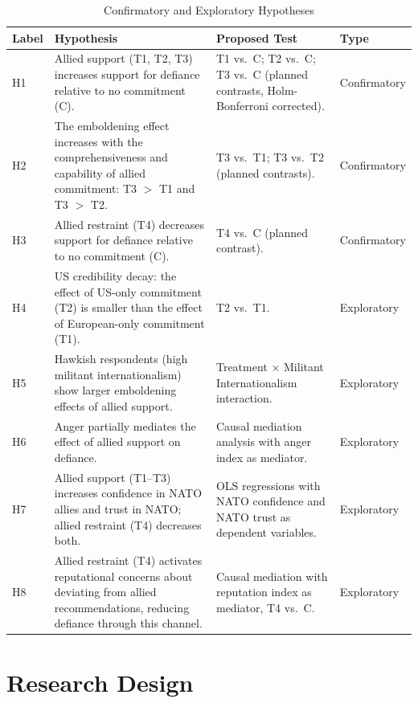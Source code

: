 \begin{table}[H]
\centering
\caption{Confirmatory and Exploratory Hypotheses}
\label{tab:hypotheses}
\footnotesize
\begin{tabular}{p{1.2cm} p{5.5cm} p{5.3cm} p{1.2cm}}
\toprule
\textbf{Label} & \textbf{Hypothesis} & \textbf{Proposed Test} & \textbf{Type} \\
\midrule
H1 & Allied support (T1, T2, T3) increases support for defiance relative to no commitment (C). & T1 vs.\ C; T2 vs.\ C; T3 vs.\ C (planned contrasts, Holm-Bonferroni corrected). & Confirmatory \\[8pt]
H2 & The emboldening effect increases with the comprehensiveness and capability of allied commitment: T3 $>$ T1 and T3 $>$ T2. & T3 vs.\ T1; T3 vs.\ T2 (planned contrasts). & Confirmatory \\[8pt]
H3 & Allied restraint (T4) decreases support for defiance relative to no commitment (C). & T4 vs.\ C (planned contrast). & Confirmatory \\[8pt]
\midrule
H4 & US credibility decay: the effect of US-only commitment (T2) is smaller than the effect of European-only commitment (T1). & T2 vs.\ T1. & Exploratory \\[8pt]
H5 & Hawkish respondents (high militant internationalism) show larger emboldening effects of allied support. & Treatment $\times$ Militant Internationalism interaction. & Exploratory \\[8pt]
H6 & Anger partially mediates the effect of allied support on defiance. & Causal mediation analysis with anger index as mediator. & Exploratory \\[8pt]
H7 & Allied support (T1--T3) increases confidence in NATO allies and trust in NATO; allied restraint (T4) decreases both. & OLS regressions with NATO confidence and NATO trust as dependent variables. & Exploratory \\[8pt]
H8 & Allied restraint (T4) activates reputational concerns about deviating from allied recommendations, reducing defiance through this channel. & Causal mediation with reputation index as mediator, T4 vs.\ C. & Exploratory \\
\bottomrule
\end{tabular}
\end{table}


\section{Research Design}
\label{sec:design}

